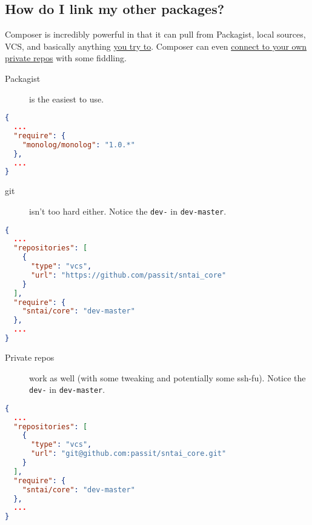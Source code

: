 \documentclass[pdf]{beamer}
\newcommand{\com}[1]{\lstinline$#1$}
\begin{document}
\subsection{How do I link my other packages?}
\begin{frame}
Composer is incredibly powerful in that it can pull from Packagist, local sources, VCS, and basically anything \href{https://getcomposer.org/doc/02-libraries.md}{you try to}. Composer can even \href{https://getcomposer.org/doc/articles/http-basic-authentication.md}{connect to your own private repos} with some fiddling.
\end{frame}
\begin{frame}[fragile]
\begin{description}
\item[Packagist] is the easiest to use.
\end{description}
\begin{lstlisting}[language=json]
{
  ...
  "require": {
    "monolog/monolog": "1.0.*"
  },
  ...
}
\end{lstlisting}
\end{frame}
\begin{frame}[fragile]
\begin{description}
\item[git] isn't too hard either. Notice the \com{dev-} in \com{dev-master}.
\end{description}
\begin{lstlisting}[language=json]
{
  ...
  "repositories": [
    {
      "type": "vcs",
      "url": "https://github.com/passit/sntai_core"
    }
  ],
  "require": {
    "sntai/core": "dev-master"
  },
  ...
}
\end{lstlisting}
\end{frame}
\begin{frame}[fragile]
\begin{description}
\item[Private repos] work as well (with some tweaking and potentially some ssh-fu). Notice the \com{dev-} in \com{dev-master}.
\end{description}
\begin{lstlisting}[language=json]
{
  ...
  "repositories": [
    {
      "type": "vcs",
      "url": "git@github.com:passit/sntai_core.git"
    }
  ],
  "require": {
    "sntai/core": "dev-master"
  },
  ...
}
\end{lstlisting}
\end{frame}
\end{document}

